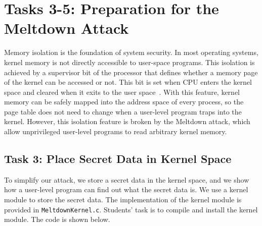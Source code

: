 
\newcommand{\sideChannelFigs}{./Figs}





\section{Tasks 3-5: Preparation for the Meltdown Attack}


Memory isolation is the foundation of system security. In most operating systems, 
kernel memory is not directly accessible to user-space programs. This isolation is achieved 
by a supervisor bit of the processor that defines whether a memory page of the kernel can be
accessed or not. This bit is set when CPU enters the kernel space and
cleared when it exits to the user space~\cite{wiki:protectionring}. 
With this feature, kernel memory can be safely mapped into the address space 
of every process, so the page table does not need to change when a user-level program
traps into the kernel. 
However, this isolation feature is broken by the Meltdown attack, 
which allow unprivileged user-level programs to read arbitrary kernel memory.



\subsection{Task 3: Place Secret Data in Kernel Space}

To simplify our attack, we store 
a secret data in the kernel space, and we show how a user-level program can find out what the
secret data is. We use a kernel module to store the secret data.  The implementation of the
kernel module is provided in \texttt{MeltdownKernel.c}. 
Students' task is to compile and install the kernel module. The code is shown below. 


